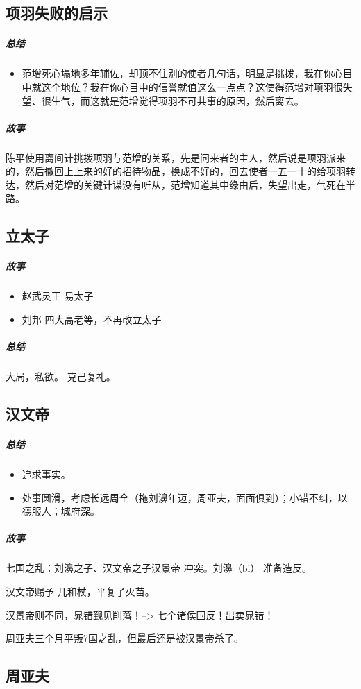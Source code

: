 \documentclass[UTF8,a4paper,8pt]{ctexbook}
\begin{document}
		\subsection{项羽失败的启示}
			\subparagraph{总结}
				\begin{itemize}
					\item 范增死心塌地多年辅佐，却顶不住别的使者几句话，明显是挑拨，我在你心目中就这个地位？我在你心目中的信誉就值这么一点点？这使得范增对项羽很失望、很生气，而这就是范增觉得项羽不可共事的原因，然后离去。
				\end{itemize}
			\subparagraph{故事}
				陈平使用离间计挑拨项羽与范增的关系，先是问来者的主人，然后说是项羽派来的，然后撤回上上来的好的招待物品，换成不好的，回去使者一五一十的给项羽转达，然后对范增的关键计谋没有听从，范增知道其中缘由后，失望出走，气死在半路。
			
		\subsection{立太子}
			\subparagraph{故事}
				\begin{itemize}
					\item 赵武灵王  易太子
					\item 刘邦      四大高老等，不再改立太子
				\end{itemize}
			
			\subparagraph{总结}
				大局，私欲。
				克己复礼。
		
		\subsection{汉文帝}
			\subparagraph{总结}
				\begin{itemize}[itemindent = 1em]
					\item 追求事实。
					\item 处事圆滑，考虑长远周全（拖刘濞年迈，周亚夫，面面俱到）；小错不纠，以德服人；城府深。
				\end{itemize}
			
			\subparagraph{故事}
				
				七国之乱：刘濞之子、汉文帝之子汉景帝 冲突。刘濞（bi） 准备造反。
				
				汉文帝赐予 几和杖，平复了火苗。
				
				汉景帝则不同，晁错觐见削藩！--> 七个诸侯国反！出卖晁错！
				
				周亚夫三个月平叛7国之乱，但最后还是被汉景帝杀了。
		
		\subsection{周亚夫}
		
\end{document}
